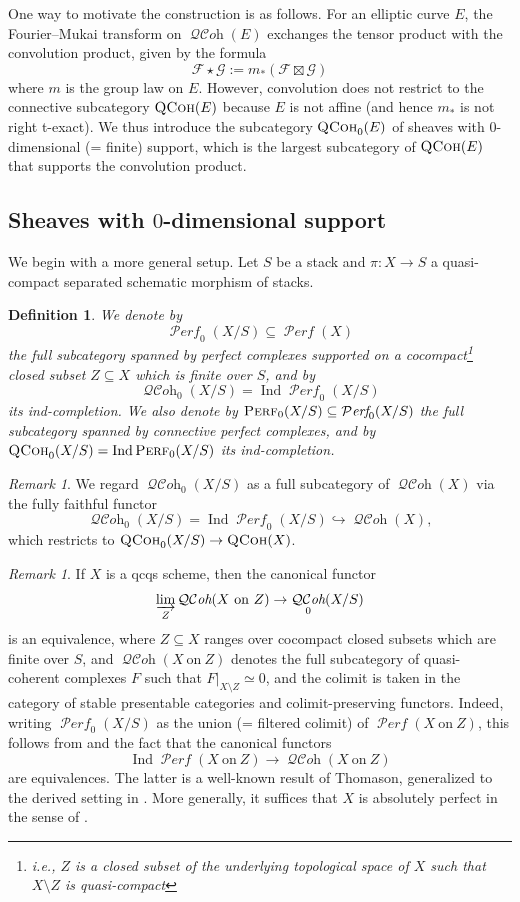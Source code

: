 \documentclass[12pt, oneside]{amsart}
\numberwithin{equation}{section}
\newtheorem{definition}[subsubsection]{Definition}
\theoremstyle{remark}
\newtheorem{remark}[subsubsection]{Remark}
\theoremstyle{plain}
\DeclareMathOperator{\QCoh}{\textsc{QCoh}}
\DeclareMathOperator{\QCOH}{\mathcal{QC}\textit{oh}}
\DeclareMathOperator{\Perf}{\textsc{Perf}}
\DeclareMathOperator{\PERF}{\mathcal{P}\textit{erf}}
\newcommand{\Ind}{\operatorname{Ind}}
\begin{document}
One way to motivate the construction is as follows.
For an elliptic curve $E$, the Fourier--Mukai transform \cite{Mukai} on $\QCOH(E)$ exchanges the tensor product with the convolution product, given by the formula
$$ \mathcal{F} \star \mathcal{G} := m_*( \mathcal{F} \boxtimes \mathcal{G} ) $$
where $m$ is the group law on $E$.
However, convolution does not restrict to the connective subcategory $\QCoh(E)$ because $E$ is not affine (and hence $m_*$ is not right t-exact).
We thus introduce the subcategory $\QCoh_0(E)$ of sheaves with $0$-dimensional (= finite) support, which is the largest subcategory of $\QCoh(E)$ that supports the convolution product.

\subsection{Sheaves with $0$-dimensional support}\label{ssec:QCoh0}

We begin with a more general setup. Let $S$ be a stack and $\pi : X \to S$ a quasi-compact separated schematic morphism of stacks.

\begin{definition}\label{perf0} We denote by
\[\PERF_{0}(X/S) \subseteq \PERF(X) \]
the full subcategory spanned by perfect complexes supported on a cocompact\footnote{i.e., $Z$ is a closed subset of the underlying topological space of $X$ such that $X\setminus Z$ is quasi-compact} closed subset $Z \subseteq X$ which is finite over $S$, and by
\[ \QCOH_{0}(X/S) = \Ind \PERF_{0}(X/S) \]
its ind-completion.
We also denote by $\Perf_{0}(X/S) \subseteq \PERF_{0}(X/S)$ the full subcategory spanned by connective perfect complexes, and by $\QCoh_{0}(X/S) = \Ind \Perf_{0}(X/S)$ its ind-completion. \end{definition}

\begin{remark}
  We regard $\QCOH_0(X/S)$ as a full subcategory of $\QCOH(X)$ via the fully faithful functor
  \[
    \QCOH_0(X/S) = \Ind\PERF_0(X/S) \hookrightarrow \QCOH(X),
  \]
  which restricts to $\QCoh_0(X/S) \to \QCoh(X)$.
\end{remark}

\begin{remark}
  If $X$ is a qcqs scheme, then the canonical functor
  \[ \varinjlim_Z \QCOH(X~\mathrm{on}~Z) \to \QCOH_0(X/S) \]
  is an equivalence, where $Z \subseteq X$ ranges over cocompact closed subsets which are finite over $S$, and $\QCOH(X~\mathrm{on}~Z)$ denotes the full subcategory of quasi-coherent complexes $F$ such that $F|_{X\setminus Z}\simeq 0$, and the colimit is taken in the category of stable presentable categories and colimit-preserving functors.
  Indeed, writing $\PERF_0(X/S)$ as the union (= filtered colimit) of $\PERF(X~\mathrm{on}~Z)$, this follows from \cite[Lem.~5.3.2.9]{LurieHA} and the fact that the canonical functors
  \[ \Ind\PERF(X~\mathrm{on}~Z) \to \QCOH(X~\mathrm{on}~Z) \]
  are equivalences.
  The latter is a well-known result of Thomason, generalized to the derived setting in \cite[\S 5.2]{ToenAzumaya}.
  More generally, it suffices that $X$ is absolutely perfect in the sense of \cite[Def.~1.47]{KhanKstack}.
\end{remark}
\end{document}
